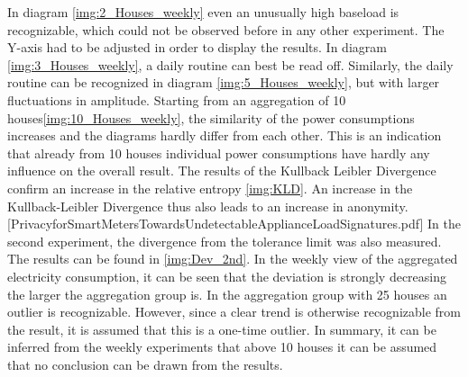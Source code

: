 In diagram \ref{img:2_Houses_weekly} even an unusually high baseload is recognizable, which could not be observed before in any other experiment. The Y-axis had to be adjusted in order to display the results. In diagram \ref{img:3_Houses_weekly}, a daily routine can best be read off. Similarly, the daily routine can be recognized in diagram \ref{img:5_Houses_weekly}, but with larger fluctuations in amplitude. Starting from an aggregation of 10 houses\ref{img:10_Houses_weekly}, the similarity of the power consumptions increases and the diagrams hardly differ from each other. This is an indication that already from 10 houses individual power consumptions have hardly any influence on the overall result. The results of the Kullback Leibler Divergence confirm an increase in the relative entropy \ref{img:KLD}. An increase in the Kullback-Leibler Divergence thus also leads to an increase in anonymity.[PrivacyforSmartMetersTowardsUndetectableApplianceLoadSignatures.pdf]
In the second experiment, the divergence from the tolerance limit was also measured. The results can be found in \ref{img:Dev_2nd}. In the weekly view of the aggregated electricity consumption, it can be seen that the deviation is strongly decreasing the larger the aggregation group is. In the aggregation group with 25 houses an outlier is recognizable. However, since a clear trend is otherwise recognizable from the result, it is assumed that this is a one-time outlier. In summary, it can be inferred from the weekly experiments that above 10 houses it can be assumed that no conclusion can be drawn from the results.

